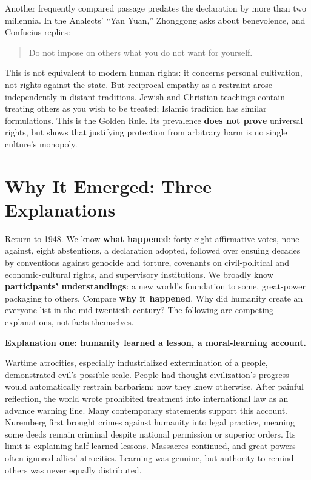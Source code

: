 Another frequently compared passage predates the declaration by more than two millennia. In the Analects' ``Yan Yuan,'' Zhonggong asks about benevolence, and Confucius replies:

\begin{quote}
Do not impose on others what you do not want for yourself.
\end{quote}
This is not equivalent to modern human rights: it concerns personal cultivation, not rights against the state. But reciprocal empathy as a restraint arose independently in distant traditions. Jewish and Christian teachings contain treating others as you wish to be treated; Islamic tradition has similar formulations. This is the Golden Rule. Its prevalence \textbf{does not prove} universal rights, but shows that justifying protection from arbitrary harm is no single culture's monopoly.

\section{Why It Emerged: Three Explanations}
Return to 1948. We know \textbf{what happened}: forty-eight affirmative votes, none against, eight abstentions, a declaration adopted, followed over ensuing decades by conventions against genocide and torture, covenants on civil-political and economic-cultural rights, and supervisory institutions. We broadly know \textbf{participants' understandings}: a new world's foundation to some, great-power packaging to others. Compare \textbf{why it happened}. Why did humanity create an everyone list in the mid-twentieth century? The following are competing explanations, not facts themselves.

\textbf{Explanation one: humanity learned a lesson, a moral-learning account.}

Wartime atrocities, especially industrialized extermination of a people, demonstrated evil's possible scale. People had thought civilization's progress would automatically restrain barbarism; now they knew otherwise. After painful reflection, the world wrote prohibited treatment into international law as an advance warning line. Many contemporary statements support this account. Nuremberg first brought crimes against humanity into legal practice, meaning some deeds remain criminal despite national permission or superior orders. Its limit is explaining half-learned lessons. Massacres continued, and great powers often ignored allies' atrocities. Learning was genuine, but authority to remind others was never equally distributed.

